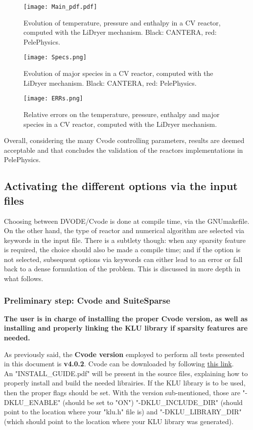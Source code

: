 \documentclass[12pt]{article}
\begin{document}
\begin{figure*}[http]
\centering
\texttt{[image: Main\_pdf.pdf]}
\caption{Evolution of temperature, pressure and enthalpy in a CV reactor, computed with the LiDryer mechanism. Black: CANTERA, red: PelePhysics.}
\label{Fig:MainH2}
\end{figure*}

\begin{figure*}
\centering
\texttt{[image: Specs.png]}
\caption{Evolution of major species in a CV reactor, computed with the LiDryer mechanism. Black: CANTERA, red: PelePhysics.}
\label{Fig:SpecsH2}
\end{figure*}

\begin{figure*}
\centering
\texttt{[image: ERRs.png]}
\caption{Relative errors on the temperature, pressure, enthalpy and major species in a CV reactor, computed with the LiDryer mechanism.}
\label{Fig:ErrH2}
\end{figure*}

Overall, considering the many Cvode controlling parameters, results are deemed acceptable and that concludes the validation of the reactors implementations in PelePhysics.

\subsection{Activating the different options via the input files}
\label{subs::PPOptions}
Choosing between DVODE/Cvode is done at compile time, via the GNUmakefile. On the other hand, the type of reactor and numerical algorithm are selected via keywords in the input file. There is a subtlety though: when any sparsity feature is required, the choice should also be made a compile time; and if the option is not selected, subsequent options via keywords can either lead to an error or fall back to a dense formulation of the problem. This is discussed in more depth in what follows.

\subsubsection{Preliminary step: Cvode and SuiteSparse}
\textbf{The user is in charge of installing the proper Cvode version, as well as installing and properly linking the KLU library if sparsity features are needed.}

As previously said, the \textbf{Cvode version} employed to perform all tests presented in this document is \textbf{v4.0.2}. Cvode can be downloaded by following \href{https://computation.llnl.gov/projects/sundials/sundials-software}{this link}. \\ 
An "INSTALL_GUIDE.pdf" will be present in the source files, explaining how to properly install and build the needed librairies. If the KLU library is to be used, then the proper flags should be set. With the version sub-mentioned, those are "-DKLU_ENABLE" (should be set to "ON")  "-DKLU_INCLUDE_DIR" (should point to the location where your "klu.h" file is) and "-DKLU_LIBRARY_DIR" (which should point to the location where your KLU library was generated). 
\end{document}

